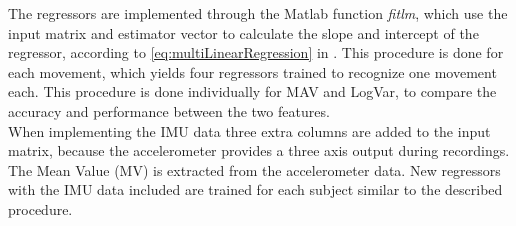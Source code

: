 %
The regressors are implemented through the Matlab function \textit{fitlm}, which use the input matrix and estimator vector to calculate the slope and intercept of the regressor, according to \eqref{eq:multiLinearRegression} in .
This procedure is done for each movement, which yields four regressors trained to recognize one movement each. This procedure is done individually for MAV and LogVar, to compare the accuracy and performance between the two features. \\
When implementing the IMU data three extra columns are added to the input matrix, because the accelerometer provides a three axis output during recordings. The Mean Value (MV) is extracted from the accelerometer data. New regressors with the IMU data included are trained for each subject similar to the described procedure.


